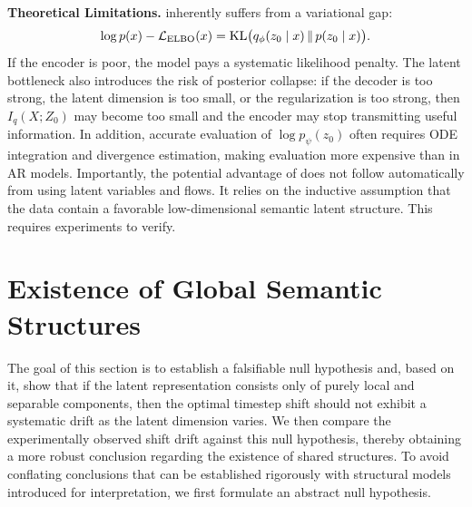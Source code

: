 \textbf{Theoretical Limitations.}
\method inherently suffers from a variational gap:
\begin{equation}
\log p(x)-\mathcal{L}_{\mathrm{ELBO}}(x)
=
\mathrm{KL}\bigl(q_{\phi}(z_0\mid x)\,\|\,p(z_0\mid x)\bigr).
\label{eq:app_variational_gap}
\end{equation}
If the encoder is poor, the model pays a systematic likelihood penalty. The latent bottleneck also introduces the risk of posterior collapse: if the decoder is too strong, the latent dimension is too small, or the regularization is too strong, then $I_q(X;Z_0)$ may become too small and the encoder may stop transmitting useful information. In addition, accurate evaluation of $\log p_{\psi}(z_0)$ often requires ODE integration and divergence estimation, making evaluation more expensive than in AR models. Importantly, the potential advantage of \method does not follow automatically from using latent variables and flows. It relies on the inductive assumption that the data contain a favorable low-dimensional semantic latent structure. This requires experiments to verify.

\section{Existence of Global Semantic Structures}
\label{sec:global_semantic_structure}

The goal of this section is to establish a falsifiable null hypothesis and, based on it, show that if the latent representation consists only of purely local and separable components, then the optimal timestep shift should not exhibit a systematic drift as the latent dimension varies. We then compare the experimentally observed shift drift against this null hypothesis, thereby obtaining a more robust conclusion regarding the existence of shared structures. To avoid conflating conclusions that can be established rigorously with structural models introduced for interpretation, we first formulate an abstract null hypothesis.

